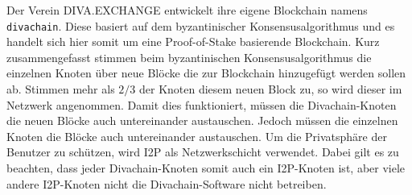 Der Verein DIVA.EXCHANGE entwickelt ihre eigene Blockchain namens \lstinline|divachain|.
Diese basiert auf dem byzantinischer Konsensusalgorithmus und es handelt sich hier somit um eine Proof-of-Stake basierende Blockchain.
Kurz zusammengefasst stimmen beim byzantinischen Konsensusalgorithmus die einzelnen Knoten über neue Blöcke die zur Blockchain hinzugefügt werden sollen ab.
Stimmen mehr als $2/3$ der Knoten diesem neuen Block zu, so wird dieser im Netzwerk angenommen.
Damit dies funktioniert, müssen die Divachain-Knoten die neuen Blöcke auch untereinander austauschen.
Jedoch müssen die einzelnen Knoten die Blöcke auch untereinander austauschen.
Um die Privatsphäre der Benutzer zu schützen, wird I2P als Netzwerkschicht verwendet.
Dabei gilt es zu beachten, dass jeder Divachain-Knoten somit auch ein I2P-Knoten ist, aber viele andere I2P-Knoten nicht die Divachain-Software nicht betreiben. 

